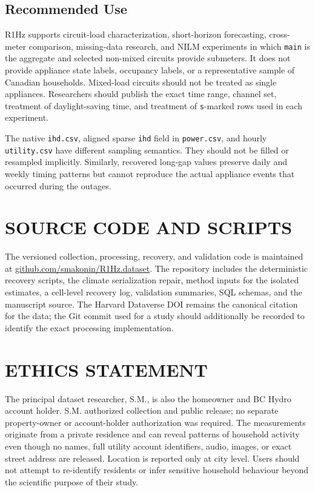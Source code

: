 \documentclass{IEEEoj-data}
\begin{document}
\subsection{Recommended Use}
R1Hz supports circuit-load characterization, short-horizon forecasting, cross-meter comparison, missing-data research, and NILM experiments in which \texttt{main} is the aggregate and selected non-mixed circuits provide submeters. It does not provide appliance state labels, occupancy labels, or a representative sample of Canadian households. Mixed-load circuits should not be treated as single appliances. Researchers should publish the exact time range, channel set, treatment of daylight-saving time, and treatment of \texttt{s}-marked rows used in each experiment.

The native \texttt{ihd.csv}, aligned sparse \texttt{ihd} field in \texttt{power.csv}, and hourly \texttt{utility.csv} have different sampling semantics. They should not be filled or resampled implicitly. Similarly, recovered long-gap values preserve daily and weekly timing patterns but cannot reproduce the actual appliance events that occurred during the outages.

\section*{SOURCE CODE AND SCRIPTS}
The versioned collection, processing, recovery, and validation code is maintained at \href{https://github.com/smakonin/R1Hz.dataset}{github.com/smakonin/R1Hz.dataset}. The repository includes the deterministic recovery scripts, the climate serialization repair, method inputs for the isolated estimates, a cell-level recovery log, validation summaries, SQL schemas, and the manuscript source. The Harvard Dataverse DOI remains the canonical citation for the data; the Git commit used for a study should additionally be recorded to identify the exact processing implementation.

\section*{ETHICS STATEMENT}
The principal dataset researcher, S.M., is also the homeowner and BC Hydro account holder. S.M. authorized collection and public release; no separate property-owner or account-holder authorization was required. The measurements originate from a private residence and can reveal patterns of household activity even though no names, full utility account identifiers, audio, images, or exact street address are released. Location is reported only at city level. Users should not attempt to re-identify residents or infer sensitive household behaviour beyond the scientific purpose of their study.
\end{document}
